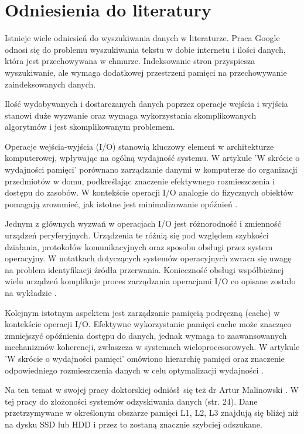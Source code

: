 \section{Odniesienia do literatury}

Istnieje wiele odniesień do wyszukiwania danych w literaturze. Praca Google 
\cite{bib:internet:htmlSearchGoogle} odnosi się do problemu wyszukiwania tekstu 
w dobie internetu i ilości danych, która jest przechowywana w chmurze. 
Indeksowanie stron przyspiesza wyszukiwanie, ale wymaga dodatkowej przestrzeni
pamięci na przechowywanie zaindeksowanych danych.

Ilość wydobywanych i dostarczanych danych poprzez operacje wejścia i wyjścia stanowi duże wyzwanie
oraz wymaga wykorzystania skomplikowanych algorytmów i jest skomplikowanym
problemem. 

Operacje wejścia-wyjścia (I/O) stanowią kluczowy element w architekturze 
komputerowej, wpływając na ogólną wydajność systemu. W artykule 'W skrócie o 
wydajności pamięci' porównano zarządzanie danymi w komputerze do 
organizacji przedmiotów w domu, podkreślając znaczenie efektywnego 
rozmieszczenia i dostępu do zasobów. W kontekście operacji I/O analogie do 
fizycznych obiektów pomagają zrozumieć, jak istotne jest minimalizowanie 
opóźnień \cite{bib:internet:IntelMemoryPerformance}. 

Jednym z głównych wyzwań w operacjach I/O jest różnorodność i zmienność 
urządzeń peryferyjnych. Urządzenia te różnią się pod względem szybkości 
działania, protokołów komunikacyjnych oraz sposobu obsługi przez system 
operacyjny. W notatkach dotyczących systemów operacyjnych zwraca się uwagę na 
problem identyfikacji źródła przerwania. Konieczność obsługi współbieżnej 
wielu urządzeń komplikuje proces zarządzania operacjami I/O co opisane
zostało na wykładzie \cite{bib:internet:UrzadzeniaWejsciaWyjscia}. 

Kolejnym istotnym aspektem jest zarządzanie pamięcią podręczną (cache) w 
kontekście operacji I/O. Efektywne wykorzystanie pamięci cache może znacząco 
zmniejszyć opóźnienia dostępu do danych, jednak wymaga to zaawansowanych 
mechanizmów koherencji, zwłaszcza w systemach wieloprocesorowych. W artykule 
'W skrócie o wydajności pamięci' omówiono hierarchię pamięci oraz znaczenie 
odpowiedniego rozmieszczenia danych w celu optymalizacji wydajności \cite{bib:internet:IntelMemoryPerformance}.

Na ten temat w swojej pracy doktorskiej odniósł się też dr Artur Malinowski \cite{bib:internet:ArturMalinowskiIO}.
W tej pracy do złożoności systemów odzyskiwania danych (str. 24). Dane 
przetrzymywane w określonym obszarze pamięci L1, L2, L3 znajdują się
bliżej niż na dysku SSD lub HDD i przez to zostaną znacznie szybciej odszukane. 


